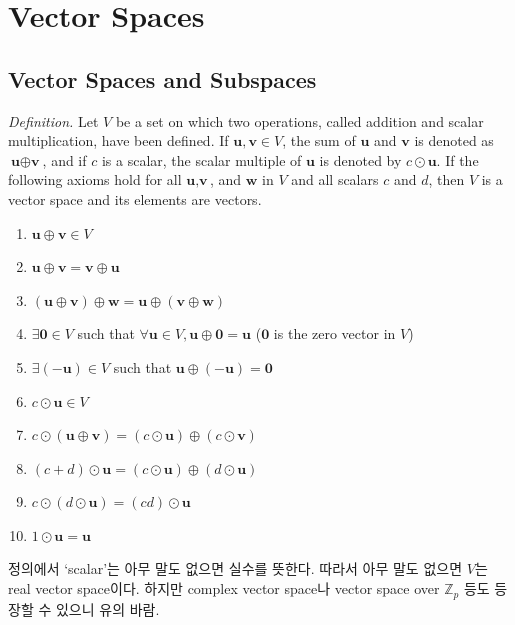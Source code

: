 \setcounter{chapter}{5}

\chapter{Vector Spaces}
\section{Vector Spaces and Subspaces}

\textit{Definition.} Let $V$ be a set on which two operations, called addition and scalar multiplication, have been defined. If $\textbf{u}, \textbf{v} \in V$, the sum of $\textbf{u}$ and $\textbf{v}$ is denoted as $\textbf{u} \oplus \textbf{v}$, and if $c$ is a scalar, the scalar multiple of $\textbf{u}$ is denoted by $c \odot \textbf{u}$. If the following axioms hold for all $\textbf{u}, \textbf{v}$, and $\textbf{w}$ in $V$ and all scalars $c$ and $d$, then $V$ is a vector space and its elements are vectors.
\begin{enumerate}
	\item $\textbf{u} \oplus \textbf{v} \in V$
	\item $\textbf{u} \oplus \textbf{v} = \textbf{v} \oplus \textbf{u}$
	\item $(\textbf{u} \oplus \textbf{v}) \oplus \textbf{w} = \textbf{u} \oplus (\textbf{v} \oplus \textbf{w})$
	\item $\exists\textbf{0} \in V$ such that $\forall\textbf{u} \in V, \textbf{u} \oplus \textbf{0} = \textbf{u}$ ($\textbf{0}$ is the zero vector in $V$)
	\item $\exists(-\textbf{u}) \in V$ such that $\textbf{u} \oplus (-\textbf{u}) = \textbf{0}$
	\item $c \odot \textbf{u} \in V$
	\item $c \odot (\textbf{u} \oplus \textbf{v}) = (c \odot \textbf{u}) \oplus (c \odot \textbf{v})$
	\item $(c+d) \odot \textbf{u} = (c \odot \textbf{u}) \oplus (d \odot \textbf{u})$
	\item $c \odot (d \odot \textbf{u}) = (cd) \odot \textbf{u}$
	\item $1 \odot \textbf{u} = \textbf{u}$
\end{enumerate}

{\color{blue}정의에서 `scalar'는 아무 말도 없으면 실수를 뜻한다. 따라서 아무 말도 없으면 $V$는 real vector space이다. 하지만 complex vector space나 vector space over $\mathbb{Z}_p$ 등도 등장할 수 있으니 유의 바람.} \\


